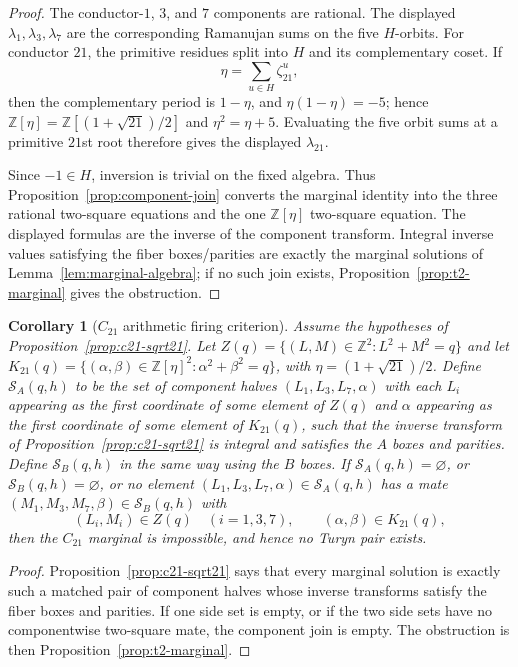 \documentclass[11pt]{article}
\theoremstyle{plain}
\newtheorem{corollary}[theorem]{Corollary}
\theoremstyle{definition}
\theoremstyle{remark}
\newcommand{\Z}{\mathbb Z}
\begin{document}
\begin{proof}
The conductor-$1$, $3$, and $7$ components are rational. The displayed
$\lambda_1,\lambda_3,\lambda_7$ are the corresponding Ramanujan sums on the
five $H$-orbits. For conductor $21$, the primitive residues split into $H$ and
its complementary coset. If
\[
  \eta=\sum_{u\in H}\zeta_{21}^u,
\]
then the complementary period is $1-\eta$, and
$\eta(1-\eta)=-5$; hence $\Z[\eta]=\Z[(1+\sqrt{21})/2]$ and
$\eta^2=\eta+5$. Evaluating the five orbit sums at a primitive $21$st root
therefore gives the displayed $\lambda_{21}$.

Since $-1\in H$, inversion is trivial on the fixed algebra. Thus
Proposition~\ref{prop:component-join} converts the marginal identity into the
three rational two-square equations and the one $\Z[\eta]$ two-square equation.
The displayed formulas are the inverse of the component transform. Integral
inverse values satisfying the fiber boxes/parities are exactly the marginal
solutions of Lemma~\ref{lem:marginal-algebra}; if no such join exists,
Proposition~\ref{prop:t2-marginal} gives the obstruction.
\end{proof}

\begin{corollary}[$C_{21}$ arithmetic firing criterion]\label{cor:c21-arithmetic-firing}
Assume the hypotheses of Proposition~\ref{prop:c21-sqrt21}.  Let
$Z(q)=\{(L,M)\in\Z^2:L^2+M^2=q\}$ and let
$K_{21}(q)=\{(\alpha,\beta)\in\Z[\eta]^2:\alpha^2+\beta^2=q\}$, with
$\eta=(1+\sqrt{21})/2$.  Define $\mathcal S_A(q,h)$ to be the set of
component halves $(L_1,L_3,L_7,\alpha)$ with each $L_i$ appearing as the first
coordinate of some element of $Z(q)$ and $\alpha$ appearing as the first
coordinate of some element of $K_{21}(q)$, such that the inverse transform of
Proposition~\ref{prop:c21-sqrt21} is integral and satisfies the $A$ boxes and
parities.  Define $\mathcal S_B(q,h)$ in the same way using the $B$ boxes.
If $\mathcal S_A(q,h)=\varnothing$, or $\mathcal S_B(q,h)=\varnothing$, or no
element $(L_1,L_3,L_7,\alpha)\in\mathcal S_A(q,h)$ has a mate
$(M_1,M_3,M_7,\beta)\in\mathcal S_B(q,h)$ with
\[
  (L_i,M_i)\in Z(q)\quad(i=1,3,7),
  \qquad
  (\alpha,\beta)\in K_{21}(q),
\]
then the $C_{21}$ marginal is impossible, and hence no Turyn pair exists.
\end{corollary}

\begin{proof}
Proposition~\ref{prop:c21-sqrt21} says that every marginal solution is exactly
such a matched pair of component halves whose inverse transforms satisfy the
fiber boxes and parities.  If one side set is empty, or if the two side sets
have no componentwise two-square mate, the component join is empty.  The
obstruction is then Proposition~\ref{prop:t2-marginal}.
\end{proof}
\end{document}
